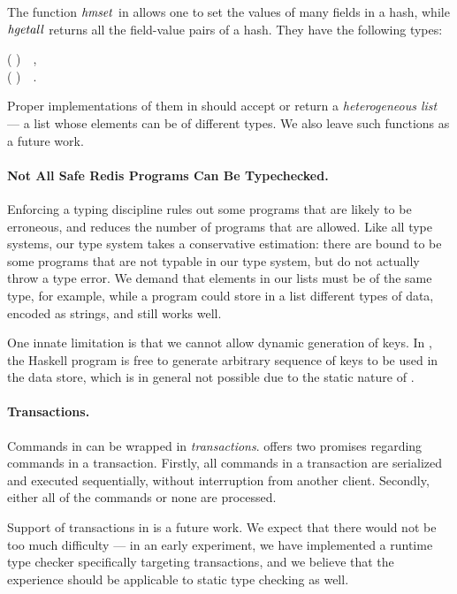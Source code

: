 The function \ensuremath{\Varid{hmset}} in \Hedis{} allows one to set the values of many fields
in a hash, while \ensuremath{\Varid{hgetall}} returns all the field-value pairs of a hash. They
have the following types:
\begin{hscode}\SaveRestoreHook
{}%
%
%
%
%
%
\>[B]{}\<[16]%
\>[16]{}\mathbin{::}\<[33]%
\>[33]{}\<[65]%
\>[65]{}\to {}\;( \uplus {}){}\<[98]%
\>[98]{}~~,{}\<[E]%
\\
\>[B]{}\<[16]%
\>[16]{}\mathbin{::}\to {}\;( )~~.{}\<[E]%
\ColumnHook
\end{hscode}\resethooks
Proper implementations of them in \Edis{} should accept or return a
\emph{heterogeneous list}~\cite{hetero} --- a list whose elements can be of
different types. We also leave such functions as a future work.

\paragraph{Not All Safe Redis Programs Can Be Typechecked.}
Enforcing a typing discipline rules out some programs that are likely to be erroneous, and reduces the number of programs that are allowed. Like all type
systems, our type system takes a conservative estimation: there are bound to be
some \Redis{} programs that are not typable in our type system, but do not
actually throw a type error. We demand that elements in our lists must be
of the same type, for example, while a \Redis{} program could store in a list
different types of data, encoded as strings, and still works well.

One innate limitation is that we cannot allow dynamic generation of keys. In
\Hedis{}, the Haskell program is free to generate arbitrary sequence of keys
to be used in the data store, which is in general not possible due to the
static nature of \Edis{}.

\paragraph{Transactions.} Commands in \Redis{} can be wrapped in
\emph{transactions}. \Redis{} offers two promises regarding commands in a
transaction. Firstly, all commands in a transaction are serialized and
executed sequentially, without interruption from another client. Secondly,
either all of the commands or none are processed.

Support of transactions in \Edis{} is a future work.
We expect that there would not be too much difficulty --- in an early
experiment, we have implemented a runtime type checker specifically targeting
\Redis{} transactions, and we believe that the experience should be applicable
to static type checking as well.
